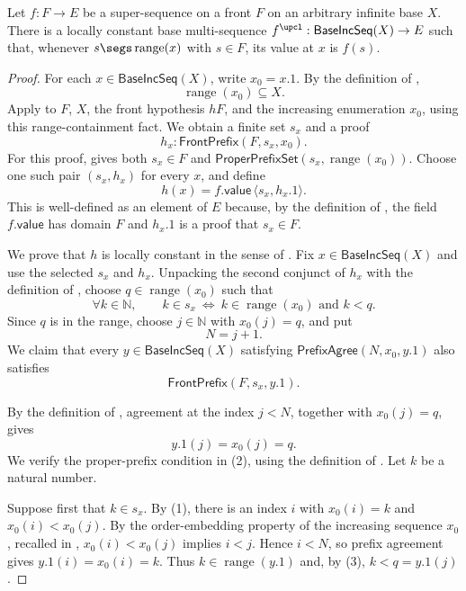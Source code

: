 \begin{lemma}
Let $f:F\to E$ be a super-sequence on a front $F$ on an arbitrary infinite
base $X$.  There is a locally constant base multi-sequence
$f^{\upcl}:\mathsf{BaseIncSeq}(X)\to E$ such that, whenever
$s\segs\operatorname{range}(x)$ with $s\in F$, its value at $x$ is $f(s)$.
\end{lemma}
\begin{proof}
For each $x\in\mathsf{BaseIncSeq}(X)$, write $x_0=x.1$.  By the definition
of ,
\[
  \operatorname{range}(x_0)\subseteq X.
\]
Apply  to $F$, $X$, the front hypothesis $hF$,
and the increasing enumeration $x_0$, using this range-containment fact.
We obtain a finite set $s_x$ and a proof
\[
  h_x:\mathsf{FrontPrefix}(F,s_x,x_0).
\]
For this proof,  gives both
$s_x\in F$ and
\(\mathsf{ProperPrefixSet}(s_x,\operatorname{range}(x_0))\).
Choose one such pair $(s_x,h_x)$ for every $x$, and define
\[
  h(x)=f.\mathsf{value}\,\langle s_x,h_x.1\rangle.
\]
This is well-defined as an element of $E$ because, by the definition of
, the field $f.\mathsf{value}$ has domain $F$ and
$h_x.1$ is a proof that $s_x\in F$.

We prove that $h$ is locally constant in the sense of
.  Fix $x\in\mathsf{BaseIncSeq}(X)$ and use
the selected $s_x$ and $h_x$.  Unpacking the second conjunct of
$h_x$ with the definition of , choose
\(q\in\operatorname{range}(x_0)\) such that
\[
  \forall k\in\mathbb N,\qquad
  k\in s_x\ \Longleftrightarrow\ k\in\operatorname{range}(x_0)
  \text{ and } k<q.                                      \tag{1}
\]
Since $q$ is in the range, choose $j\in\mathbb N$ with
\(x_0(j)=q\), and put
\[
  N=j+1.
\]
We claim that every $y\in\mathsf{BaseIncSeq}(X)$ satisfying
\(\mathsf{PrefixAgree}(N,x_0,y.1)\) also satisfies
\[
  \mathsf{FrontPrefix}(F,s_x,y.1).                         \tag{2}
\]

By the definition of , agreement at the index $j<N$,
together with $x_0(j)=q$, gives
\[
  y.1(j)=x_0(j)=q.                                         \tag{3}
\]
We verify the proper-prefix condition in (2), using the definition of
.  Let $k$ be a natural number.

Suppose first that $k\in s_x$.  By (1), there is an index $i$ with
$x_0(i)=k$ and $x_0(i)<x_0(j)$.  By the order-embedding property of the
increasing sequence $x_0$, recalled in ,
$x_0(i)<x_0(j)$ implies $i<j$.  Hence $i<N$, so prefix agreement gives
\(y.1(i)=x_0(i)=k\).  Thus
\(k\in\operatorname{range}(y.1)\) and, by (3), $k<q=y.1(j)$.


\end{proof}
